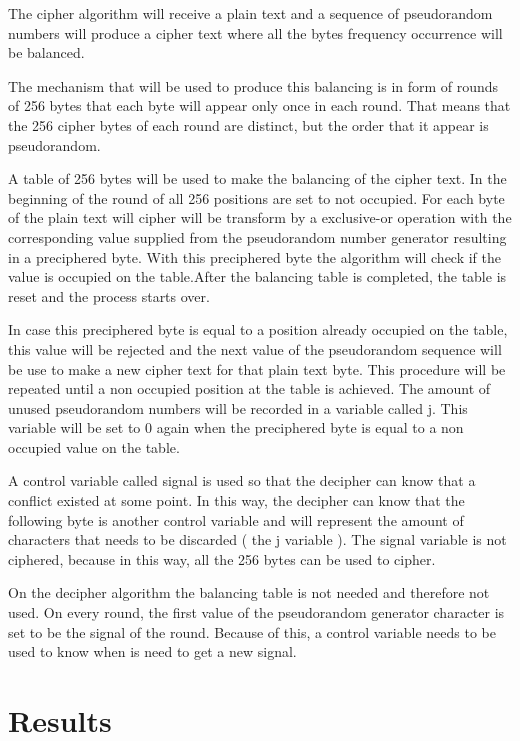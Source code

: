 \documentclass{llncs}
\begin{document}
The cipher algorithm will receive a plain text and a sequence of pseudorandom numbers will produce a cipher text where all the bytes frequency occurrence will be balanced.

The mechanism that will be used to produce this balancing is in form of rounds of 256 bytes that each byte will appear only once in each round.  That means that the 256 cipher bytes of each round are distinct, but the order that it appear is pseudorandom.

A table of 256 bytes will be used to make the balancing of the cipher text. In the beginning of the round of all 256 positions are set to not occupied. For each byte of the plain text will cipher will be transform by a exclusive-or operation with the corresponding value supplied from the pseudorandom number generator resulting in a preciphered byte. With this preciphered byte the algorithm will check if the value is occupied on the table.After the balancing table is completed, the table is reset and the process starts over.

In case this preciphered byte is equal to a position already occupied on the table, this value will be rejected and the next value of the pseudorandom sequence will be use to make a new cipher text for that plain text byte. This procedure will be repeated until a non occupied position at the table is achieved. The amount of unused pseudorandom numbers will be recorded in a variable called j. This variable will be set to 0 again when the preciphered byte is equal to a non occupied value on the table.

A control variable called signal is used so that the decipher can know that a conflict existed at some point. In this way, the decipher can know that the following byte is another control variable and will represent the amount of characters that needs to be discarded ( the j variable ). The signal variable is not ciphered, because in this way, all the 256 bytes can be used to cipher.

On the decipher algorithm the balancing table is not needed and therefore not used. On every round, the first value of the pseudorandom generator character is set to be the signal of the round. Because of this, a control variable needs to be used to know when is need to get a new signal.


\section{Results}
\end{document}
